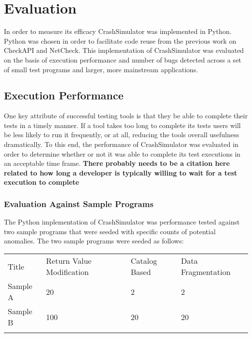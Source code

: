 \section{Evaluation}

    In order to measure its efficacy CrashSimulator was implemented in Python. Python was chosen in order to facilitate
    code reuse from the previous work on CheckAPI and NetCheck. This implementation of CrashSimulator was evaluated on
    the basis of execution performance and number of bugs detected across a set of small test programs and larger, more
    mainstream applications.

    \subsection{Execution Performance}

        One key attribute of successful testing tools is that they be able to complete their tests in a timely manner.
        If a tool takes too long to complete its tests users will be less likely to run it frequently, or at all,
        reducing the tools overall usefulness dramatically. To this end, the performance of CrashSimulator was evaluated
        in order to determine whether or not it was able to complete its test executions in an acceptable time frame.
        \textbf{There probably needs to be a citation here related to how long a developer is typically willing to wait
        for a test execution to complete}

        \subsubsection{Evaluation Against Sample Programs}

            The Python implementation of CrashSimulator was performance
            tested against two sample programs that were seeded with specific counts of potential anomalies. The two sample
            programs were seeded as follows:

            \begin{table}[H]
                \scriptsize{}
                \begin{tabular}{l  l  l  l}
                    \toprule{}
                        Title & Return Value Modification & Catalog Based & Data Fragmentation \\
                        Sample A & 20 & 2 & 2 \\
                        Sample B & 100 & 20 & 20 \\
                    \bottomrule{}
                \end{tabular}
            \end{table}

